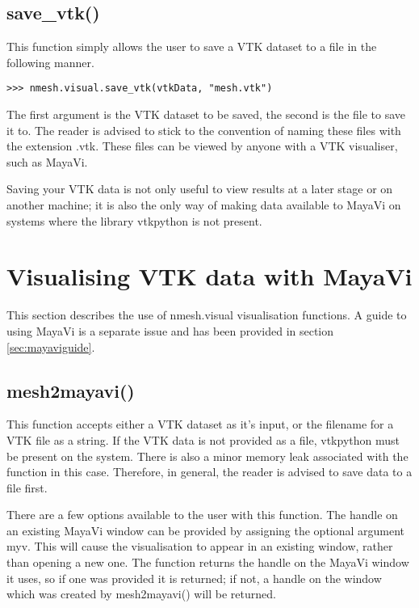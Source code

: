 \subsection{{\ttfamily save\_vtk()}}
This function simply allows the user to save a VTK dataset to a file in the following manner.
\begin{lstlisting}[basicstyle=\small\ttfamily]
>>> nmesh.visual.save_vtk(vtkData, "mesh.vtk")
\end{lstlisting}
The first argument is the VTK dataset to be saved, the second is the file to save it to. The reader is advised to stick to the convention of naming these files with the extension {\ttfamily .vtk}. These files can be viewed by anyone with a VTK visualiser, such as MayaVi.

Saving your VTK data is not only useful to view results at a later stage or on another machine; it is also the only way of making data available to MayaVi on systems where the library {\ttfamily vtkpython} is not present.





\section{Visualising VTK data with MayaVi}
This section describes the use of {\ttfamily nmesh.visual} visualisation functions. A guide to using MayaVi is a separate issue and has been provided in section \ref{sec:mayaviguide}.

\subsection{{\ttfamily mesh2mayavi()}}
This function accepts either a VTK dataset as it's input, or the filename for a VTK file as a string. If the VTK data is not provided as a file, {\ttfamily vtkpython} must be present on the system. There is also a minor memory leak associated with the function in this case. Therefore, in general, the reader is advised to save data to a file first. 

There are a few options available to the user with this function. The handle on an existing MayaVi window can be provided by assigning the optional argument {\ttfamily myv}. This will cause the visualisation to appear in an existing window, rather than opening a new one. The function returns the handle on the MayaVi window it uses, so if one was provided it is returned; if not, a handle on the window which was created by {\ttfamily mesh2mayavi()} will be returned.

